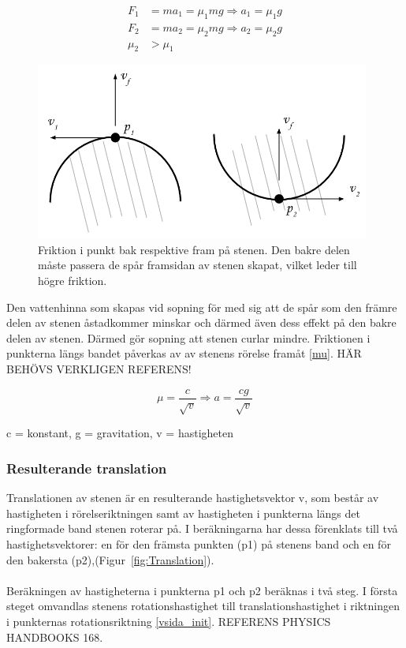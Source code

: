 \documentclass[11pt]{article} %
\begin{document}
 \begin{align}\label{Fsida1}
 F_1& = ma_1 = \mu_1 mg \Rightarrow a_1 = \mu_1 g \\\label{Fsida2}
 F_2& = ma_2 = \mu_2 mg \Rightarrow a_2 = \mu_2g \\\label{biggerthan}
 \mu_2& > \mu_1
 \end{align}

\begin{figure}[ht!]
\centering
\includegraphics[width=110mm]{Friktion_bakfram.png}
\caption{Friktion i punkt bak respektive fram på stenen. Den bakre delen måste passera de spår framsidan av stenen skapat, vilket leder till högre friktion.}
\label{fig:Friktion}
\label{overflow}
\end{figure}

Den vattenhinna som skapas vid sopning för med sig att de spår som den främre delen av stenen åstadkommer minskar och därmed  även dess effekt på den bakre delen av stenen. Därmed gör sopning att stenen curlar mindre. Friktionen i punkterna längs bandet påverkas av av stenens rörelse framåt \eqref{mu}. HÄR BEHÖVS VERKLIGEN REFERENS!     

\begin{equation}\label{mu} 
\mu = \frac{c}{\sqrt{v}} \Rightarrow a = \frac{cg}{\sqrt{v}} 
\end{equation}

c = konstant, g = gravitation, v = hastigheten

\subsubsection{Resulterande translation}

Translationen av stenen är en resulterande hastighetsvektor v, som består av hastigheten i rörelseriktningen samt av hastigheten i punkterna längs det ringformade band stenen roterar på. I beräkningarna har dessa förenklats till två hastighetsvektorer: en för den främsta punkten (p1)  på stenens band och en för den bakersta (p2),(Figur~\ref{fig:Translation}). 
\\\\Beräkningen av hastigheterna i punkterna p1 och p2 beräknas i två steg. I första steget omvandlas stenens rotationshastighet till translationshastighet i riktningen i punkternas rotationsriktning \eqref{vsida_init}. REFERENS PHYSICS HANDBOOKS 168.
 
\end{document}
